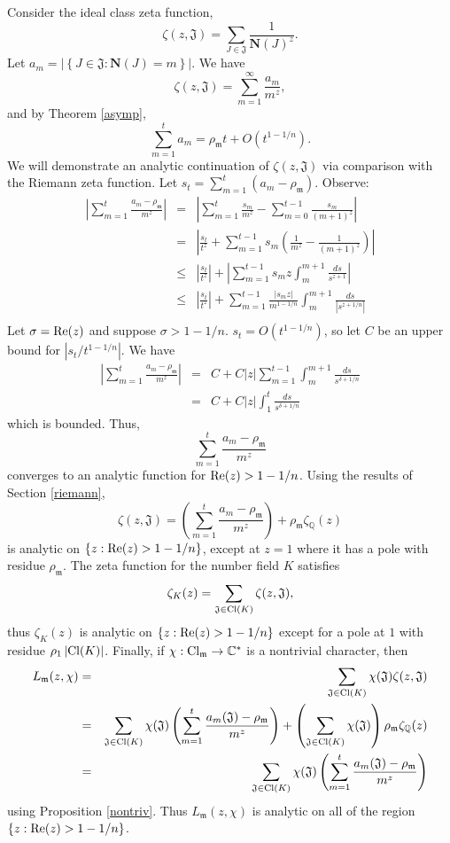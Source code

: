 \documentclass{amsart}
\def\QQ{{\mathbb Q}}
\def\CC{{\mathbb C}}
\def\mf{\mathfrak}
\def\CC{\mathbb{C}}   %
\def\Cl{\textnormal{Cl}}
\def\bN{\textbf{N}}
\def\Re{\textnormal{Re}}
\theoremstyle{definition}
\theoremstyle{remark}
\begin{document}
Consider the ideal class zeta function,
\[
\zeta( z, \mf{J}) = \sum_{J \in \mf{J}} \frac{1}{\bN(J)^z}.
\]
Let $a_m = \left| \left\{ J \in \mf{J} : \bN(J) = m \right\}
\right|$.  We have
\[
\zeta(z, \mf{J}) = \sum_{m=1}^\infty \frac{a_m}{m^z},
\]
and by Theorem \ref{asymp},
\[
\sum_{m = 1}^t a_m = \rho_\mf{m}t + O(t^{1 - 1/n}).
\]
We will demonstrate an analytic continuation of $\zeta(z,
\mf{J})$ via comparison with the Riemann zeta function.  Let $s_t
= \sum_{m=1}^t (a_m  - \rho_\mf{m})$. Observe:
\begin{eqnarray*}
\left| \sum_{m=1}^t \frac{a_m - \rho_\mf{m}}{m^z} \right| & = &
\left| \sum_{m=1}^t \frac{s_m}{m^z} - \sum_{m=0}^{t-1}
\frac{s_m}{(m+1)^z} \right| \\
& = & \left| \frac{s_t}{t^z} + \sum_{m=1}^{t-1} s_m \left(
\frac{1}{m^z} - \frac{1}{(m+1)^z} \right) \right| \\
& \leq & \left| \frac{s_t}{t^z} \right| + \left| \sum_{m=1}^{t-1}
s_mz \int_m^{m+1}
\frac{ds}{s^{z+1}} \right| \\
& \leq & \left| \frac{s_t}{t^z} \right| + \sum_{m=1}^{t-1}
\frac{\left| s_mz \right| }{m^{1 - 1/n}} \int_m^{m+1}
\frac{ds}{\left| s^{z + 1/n} \right| }  \\
\end{eqnarray*}
Let $\sigma = \Re(z)$ and suppose $\sigma > 1 - 1/n$.  $s_t =
O(t^{1 - 1/n})$, so let $C$ be an upper bound for $ \left| s_t /
t^{1 - 1/n} \right|$.  We have
\begin{eqnarray*}
\left| \sum_{m=1}^t \frac{a_m - \rho_\mf{m}}{m^z} \right| & = & C+
C |z|  \sum_{m=1}^{t-1} \int_m^{m+1}
\frac{ds}{s^{\delta + 1/n}} \\
& = & C + C |z| \int_1^t \frac{ds}{s^{\delta + 1/n}}
\end{eqnarray*}
which is bounded.  Thus,
\[
\sum_{m=1}^t \frac{a_m - \rho_\mf{m}}{m^z}
\]
converges to an analytic function for $\Re(z) > 1 - 1/n$.  Using
the results of Section \ref{riemann},
\[
\zeta(z, \mf{J}) = \left( \sum_{m=1}^t \frac{a_m -
\rho_\mf{m}}{m^z} \right) + \rho_\mf{m} \zeta_\QQ(z)
\]
is analytic on $\{ z: \Re(z) > 1 - 1/n \}$, except at $z=1$ where
it has a pole with residue $\rho_\mf{m}$.  The zeta function for
the number field $K$ satisfies
\[
\zeta_K(z) = \sum_{\mf{J} \in \Cl(K)} \zeta(z, \mf{J}),
\]
thus $\zeta_K(z)$ is analytic on $\{ z: \Re(z) > 1 - 1/n \}$
except for a pole at $1$ with residue $\rho_1 \left| \Cl(K)
\right|$.  Finally, if $\chi: \Cl_\mf{m} \to \CC^*$ is a
nontrivial character, then
\begin{eqnarray*}
L_\mf{m}(z, \chi) & = & \sum_{\mf{J} \in \Cl(K)} \chi( \mf{J} )
\zeta(z, \mf{J}) \\
& = & \sum_{\mf{J} \in \Cl(K)} \chi(\mf{J}) \left( \sum_{m=1}^t
\frac{a_m(\mf{J}) - \rho_\mf{m}}{m^z} \right) + \left(
\sum_{\mf{J} \in \Cl(K)}
 \chi(\mf{J}) \right) \rho_\mf{m} \zeta_\QQ(z) \\
& = & \sum_{\mf{J} \in \Cl(K)} \chi(\mf{J}) \left( \sum_{m=1}^t
\frac{a_m(\mf{J}) - \rho_\mf{m}}{m^z} \right)
\end{eqnarray*}
using Proposition \ref{nontriv}.  Thus $L_\mf{m}(z, \chi)$ is
analytic on all of the region $\{ z: \Re(z) > 1 - 1/n \}$.
\end{document}
